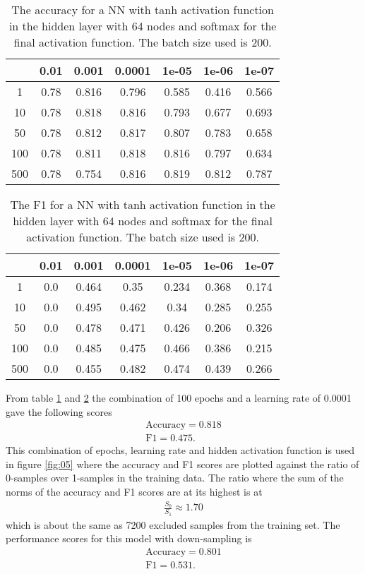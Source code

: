 \documentclass[uio,jmp,amsmath,amssymb,reprint,nofootinbib]{revtex4-1}
\numberwithin{equation}{section}
\begin{document}
\begin{table}[H]
\caption{The accuracy for a NN with tanh activation function in the hidden layer with 64 nodes and softmax for the final activation function. The batch size used is 200.}
\begin{tabular}{|c|c|c|c|c|c|c|}\hline
  & 0.01 & 0.001 & 0.0001 & 1e-05 & 1e-06 & 1e-07 \\ \hline
1 & 0.78 & 0.816 & 0.796 & 0.585 & 0.416 & 0.566 \\ \hline
10 & 0.78 & 0.818 & 0.816 & 0.793 & 0.677 & 0.693 \\ \hline
50 & 0.78 & 0.812 & 0.817 & 0.807 & 0.783 & 0.658 \\ \hline
100 & 0.78 & 0.811 & 0.818 & 0.816 & 0.797 & 0.634 \\ \hline
500 & 0.78 & 0.754 & 0.816 & 0.819 & 0.812 & 0.787 \\ \hline
\end{tabular}
\label{tab:05}
\end{table}


\begin{table}[H]
\caption{The F1 for a NN with tanh activation function in the hidden layer with 64 nodes and softmax for the final activation function. The batch size used is 200.}
\begin{tabular}{|c|c|c|c|c|c|c|}\hline
  & 0.01 & 0.001 & 0.0001 & 1e-05 & 1e-06 & 1e-07 \\ \hline
1 & 0.0 & 0.464 & 0.35 & 0.234 & 0.368 & 0.174 \\ \hline
10 & 0.0 & 0.495 & 0.462 & 0.34 & 0.285 & 0.255 \\ \hline
50 & 0.0 & 0.478 & 0.471 & 0.426 & 0.206 & 0.326 \\ \hline
100 & 0.0 & 0.485 & 0.475 & 0.466 & 0.386 & 0.215 \\ \hline
500 & 0.0 & 0.455 & 0.482 & 0.474 & 0.439 & 0.266 \\ \hline
\end{tabular}
\label{tab:06}
\end{table}

From table \ref{tab:05} and \ref{tab:06} the combination of 100 epochs and a learning rate of 0.0001 gave the following scores
\begin{align}
\text{Accuracy} = 0.818\\
\text{F1} = 0.475.
\end{align}
This combination of epochs, learning rate and hidden activation function is used in figure \ref{fig:05} where the accuracy and F1 scores are plotted against the ratio of 0-samples over 1-samples in the training data. The ratio where the sum of the norms of the accuracy and F1 scores are at its highest is at
\begin{align}\label{eq:17}
\frac{S_0}{S_1} \approx 1.70
\end{align}
which is about the same as 7200 excluded samples from the training set. The performance scores for this model with down-sampling is
\begin{align}
\text{Accuracy} = 0.801\\
\text{F1} = 0.531.
\end{align}
\end{document}
